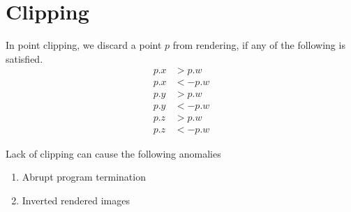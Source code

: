 \section{Clipping}
In point clipping, we discard a point $p$ from rendering, if any of the following is satisfied.
\begin{equation}
\begin{aligned}
p.x &> p.w\\
p.x &< -p.w\\
p.y &> p.w\\
p.y &< -p.w\\
p.z &> p.w\\
p.z &< -p.w
\end{aligned}
\end{equation}

Lack of clipping can cause the following anomalies
\begin{enumerate}
 \item Abrupt program termination 
 \item Inverted rendered images
\end{enumerate}

\clearpage 